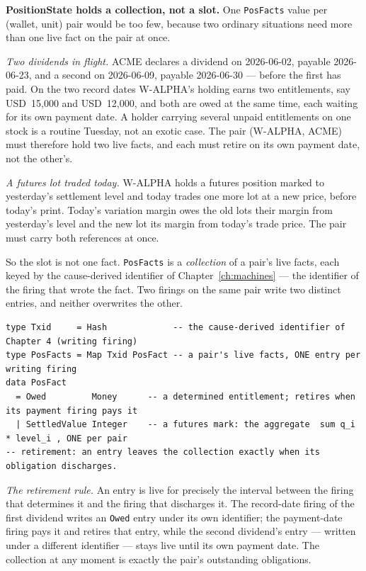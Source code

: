 \documentclass[11pt,a4paper]{article}
\newcommand{\USD}[1]{\mbox{USD~#1}}
\begin{document}
\medskip\noindent\textbf{PositionState holds a collection, not a slot.} One
\texttt{PosFacts} value per (wallet, unit) pair would be too few, because two ordinary
situations need more than one live fact on the pair at once.

\emph{Two dividends in flight.} ACME declares a dividend on 2026-06-02, payable 2026-06-23,
and a second on 2026-06-09, payable 2026-06-30 --- before the first has paid. On the two
record dates W-ALPHA's holding earns two entitlements, say \USD{15{,}000} and \USD{12{,}000},
and both are owed at the same time, each waiting for its own payment date. A holder carrying
several unpaid entitlements on one stock is a routine Tuesday, not an exotic case. The pair
(W-ALPHA, ACME) must therefore hold two live facts, and each must retire on its own payment
date, not the other's.

\emph{A futures lot traded today.} W-ALPHA holds a futures position marked to yesterday's
settlement level and today trades one more lot at a new price, before today's print. Today's
variation margin owes the old lots their margin from yesterday's level and the new lot its
margin from today's trade price. The pair must carry both references at once.

So the slot is not one fact. \texttt{PosFacts} is a \emph{collection} of a pair's live facts,
each keyed by the cause-derived identifier of Chapter~\ref{ch:machines} --- the identifier of
the firing that wrote the fact. Two firings on the same pair write two distinct entries, and
neither overwrites the other.

\begin{lstlisting}
type Txid     = Hash             -- the cause-derived identifier of Chapter 4 (writing firing)
type PosFacts = Map Txid PosFact -- a pair's live facts, ONE entry per writing firing
data PosFact
  = Owed         Money      -- a determined entitlement; retires when its payment firing pays it
  | SettledValue Integer    -- a futures mark: the aggregate  sum q_i * level_i , ONE per pair
-- retirement: an entry leaves the collection exactly when its obligation discharges.
\end{lstlisting}

\emph{The retirement rule.} An entry is live for precisely the interval between the firing
that determines it and the firing that discharges it. The record-date firing of the first
dividend writes an \texttt{Owed} entry under its own identifier; the payment-date firing pays
it and retires that entry, while the second dividend's entry --- written under a different
identifier --- stays live until its own payment date. The collection at any moment is exactly
the pair's outstanding obligations.
\end{document}
